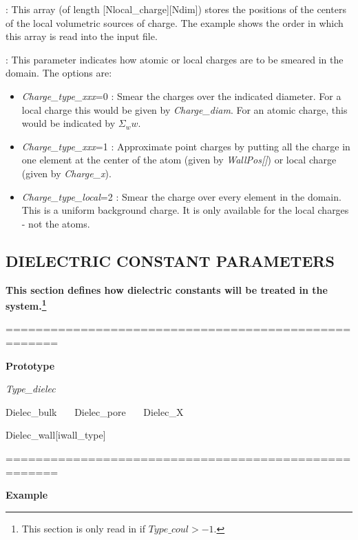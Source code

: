 \documentclass[10pt,onecolumn]{article}
\begin{document}
\vspace{0.1in}
:  This array (of length [Nlocal\_charge][Ndim])
stores the positions of the centers of the local volumetric sources of charge.
The example shows the order in which this array is read into the
input file.

\vspace{0.1in}
:  This parameter
indicates how atomic or local charges are to be smeared in the domain.  The options
are:

\begin{itemize}

\item {\it Charge\_type\_xxx}=0 : Smear the charges over the indicated diameter.
For a local charge this would be given by {\it Charge\_diam}.  For an atomic
charge, this would be indicated by $\Sigma_ww$.

\item {\it Charge\_type\_xxx}=1 : Approximate point charges by putting all the
charge in one element at the center of the atom (given by {\it WallPos[]})
or local charge (given by {\it Charge\_x}).

\item {\it Charge\_type\_local}=2 : Smear the charge over every element in the
domain.  This is a uniform background charge.  It is only available for the
local charges - not the atoms.
\end{itemize}

\vfill
\break

\subsection{DIELECTRIC CONSTANT PARAMETERS}
{\bf  This section
defines how dielectric constants will be treated in the system.\footnote{This section is only read in if $Type\_coul>-1$.}}

\noindent=====================================================

{\bf Prototype}

{\it
Type\_dielec

Dielec\_bulk \ \ \ Dielec\_pore \ \ \ Dielec\_X

Dielec\_wall[iwall\_type]
}

\noindent=====================================================

{\bf Example}
\end{document}
